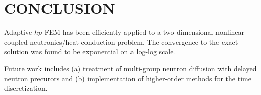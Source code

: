 \section*{CONCLUSION}
Adaptive $hp$-FEM has been efficiently applied to a two-dimensional nonlinear coupled neutronics/heat conduction problem.  The convergence to the exact solution was found to be exponential on a log-log scale.

Future work includes (a) treatment of multi-group neutron diffusion with delayed neutron precurors and (b) implementation of higher-order methods for the time discretization.


